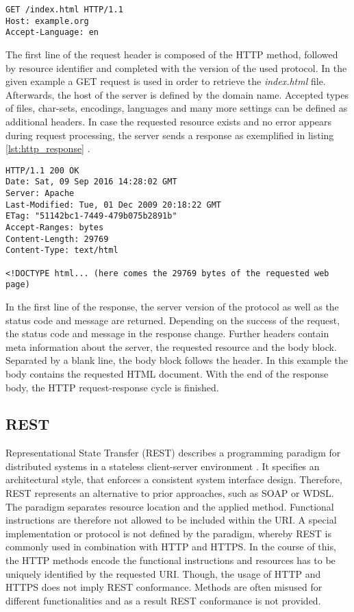 \begin{lstlisting}[caption={Example for HTTP GET request}, label={lst:http_request}]
GET /index.html HTTP/1.1
Host: example.org
Accept-Language: en
\end{lstlisting}

The first line of the request header is composed of the HTTP method, followed by resource identifier and completed with the version of the used protocol. In the given example a  GET request is used in order to retrieve the \textit{index.html} file. Afterwards, the host of the server is defined by the domain name. Accepted types of files, char-sets, encodings, languages and many more settings can be defined as additional headers. In case the requested resource exists and no error appears during request processing, the server sends a response as exemplified in listing \ref{lst:http_response} \cite{MDN:2016}.

\begin{lstlisting}[caption={Example for HTTP GET response}, label={lst:http_response}]
HTTP/1.1 200 OK
Date: Sat, 09 Sep 2016 14:28:02 GMT
Server: Apache
Last-Modified: Tue, 01 Dec 2009 20:18:22 GMT
ETag: "51142bc1-7449-479b075b2891b"
Accept-Ranges: bytes
Content-Length: 29769
Content-Type: text/html

<!DOCTYPE html... (here comes the 29769 bytes of the requested web page)
\end{lstlisting}

In the first line of the response, the server version of the protocol as well as the status code and message are returned. Depending on the success of the request, the status code and message in the response change. Further headers contain meta information about the server, the requested resource and the body block. Separated by a blank line, the body block follows the header. In this example the body contains the requested HTML document. With the end of the response body, the HTTP request-response cycle is finished.

\subsection{REST}
Representational State Transfer (REST) describes a programming paradigm for distributed systems in a stateless client-server environment \cite{Fielding:2000}. It specifies an architectural style, that enforces a consistent system interface design. Therefore, REST represents an alternative to prior approaches, such as SOAP or WDSL. The paradigm separates resource location and the applied method. Functional instructions are therefore not allowed to be included within the URI. A special implementation or protocol is not defined by the paradigm, whereby REST is commonly used in combination with HTTP and HTTPS. In the course of this, the HTTP methods encode the functional instructions and resources has to be uniquely identified by the requested URI. Though, the usage of HTTP and HTTPS does not imply REST conformance. Methods are often misused for different functionalities and as a result REST conformance is not provided.

